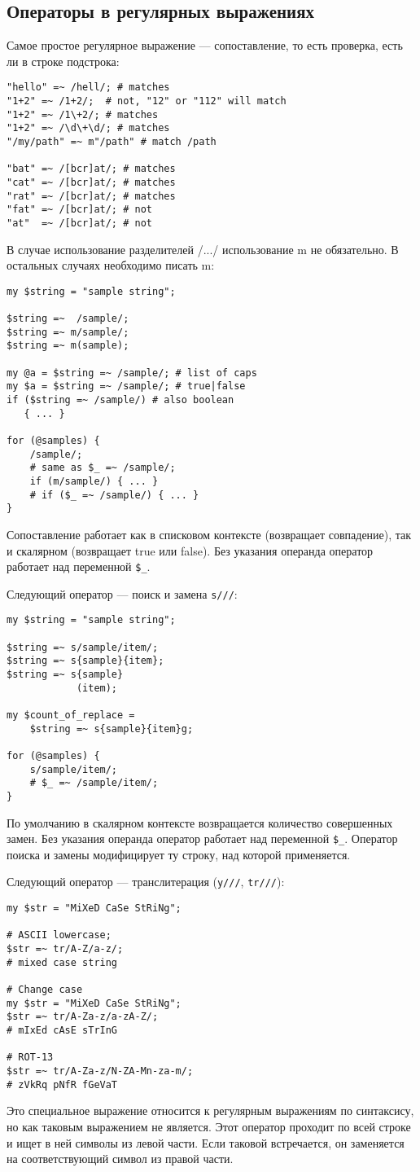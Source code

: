 \subsection{Операторы в регулярных выражениях} %
Самое простое регулярное выражение --- сопоставление, то есть проверка, есть ли в строке подстрока:
\begin{verbatim}
"hello" =~ /hell/; # matches
"1+2" =~ /1+2/;  # not, "12" or "112" will match
"1+2" =~ /1\+2/; # matches
"1+2" =~ /\d\+\d/; # matches
"/my/path" =~ m"/path" # match /path

"bat" =~ /[bcr]at/; # matches
"cat" =~ /[bcr]at/; # matches
"rat" =~ /[bcr]at/; # matches
"fat" =~ /[bcr]at/; # not
"at"  =~ /[bcr]at/; # not
\end{verbatim}
В случае использование разделителей /.../ использование m не обязательно. В остальных случаях необходимо писать m:
\begin{verbatim}
my $string = "sample string";

$string =~  /sample/;
$string =~ m/sample/;
$string =~ m(sample);

my @a = $string =~ /sample/; # list of caps
my $a = $string =~ /sample/; # true|false
if ($string =~ /sample/) # also boolean
   { ... }

for (@samples) {
    /sample/;
    # same as $_ =~ /sample/;
    if (m/sample/) { ... }
    # if ($_ =~ /sample/) { ... }
}
\end{verbatim}
Сопоставление работает как в списковом контексте (возвращает совпадение), так и скалярном (возвращает true или false). Без указания операнда оператор работает над переменной \verb|$_|.

Следующий оператор --- поиск и замена \verb|s///|:
\begin{verbatim}
my $string = "sample string";

$string =~ s/sample/item/;
$string =~ s{sample}{item};
$string =~ s{sample}
            (item);

my $count_of_replace =
    $string =~ s{sample}{item}g;

for (@samples) {
    s/sample/item/;
    # $_ =~ /sample/item/;
}
\end{verbatim}
По умолчанию в скалярном контексте возвращается количество совершенных замен. Без указания операнда оператор работает над переменной \verb|$_|. Оператор поиска и замены модифицирует ту строку, над которой применяется.


Следующий оператор --- транслитерация (\verb|y///|, \verb|tr///|):
\begin{verbatim}
my $str = "MiXeD CaSe StRiNg";

# ASCII lowercase;
$str =~ tr/A-Z/a-z/;
# mixed case string

# Change case
my $str = "MiXeD CaSe StRiNg";
$str =~ tr/A-Za-z/a-zA-Z/;
# mIxEd cAsE sTrInG

# ROT-13
$str =~ tr/A-Za-z/N-ZA-Mn-za-m/;
# zVkRq pNfR fGeVaT
\end{verbatim}
Это специальное выражение относится к регулярным выражениям по синтаксису, но как таковым выражением не является. Этот оператор проходит по всей строке и ищет в ней символы из левой части. Если таковой встречается, он заменяется на соответствующий символ из правой части.


